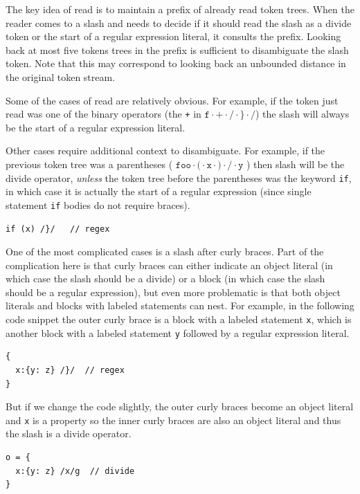 \documentclass[9pt]{sigplanconf}
\begin{document}
The key idea of read is to maintain a prefix of already read token
trees. When the reader comes to a slash and needs to decide if it
should read the slash as a divide token or the start of a regular
expression literal, it consults the prefix. Looking back at most five
tokens trees in the prefix is sufficient to disambiguate the slash
token. Note that this may correspond to looking back an unbounded
distance in the original token stream.

Some of the cases of read are relatively obvious. For example, if the
token just read was one of the binary operators (\eg the \texttt{+} in
\(\texttt{f} \cdot \texttt{+} \cdot \texttt{/} 
\cdot \texttt{\}} \cdot \texttt{/}
\)) the slash will always be the start of a regular expression
literal. 

Other cases require additional context to disambiguate. For example,
if the previous token tree was a parentheses (\eg 
\(
\texttt{foo} \cdot \texttt{(} \cdot \texttt{x} \cdot \texttt{)} \cdot \texttt{/} \cdot \texttt{y}
\)
) then slash will be the divide
operator, \emph{unless} the token tree before the parentheses was the
keyword \texttt{if}, in which case it is actually the start of a
regular expression (since single statement \texttt{if} bodies do not require
braces).

\begin{lstlisting}
if (x) /}/   // regex
\end{lstlisting}

One of the most complicated cases is a slash after curly braces. Part
of the complication here is that curly braces can either indicate an
object literal (in which case the slash should be a divide) or a block
(in which case the slash should be a regular expression), but even
more problematic is that both object literals and blocks with labeled
statements can nest. For example, in the following code snippet the
outer curly brace is a block with a labeled statement \verb!x!, which
is another block with a labeled statement \verb!y! followed by a
regular expression literal.
\begin{lstlisting}
{
  x:{y: z} /}/  // regex
}
\end{lstlisting}

But if we change the code slightly, the outer curly braces become an
object literal and \verb!x! is a property so the inner curly
braces are also an object literal and thus the slash is a divide operator.

\begin{lstlisting}
o = {
  x:{y: z} /x/g  // divide
}
\end{lstlisting}
\end{document}
